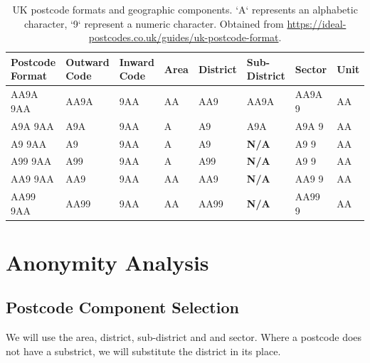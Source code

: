 \documentclass[12pt, a4paper]{article}
\begin{document}
\begin{table}
\begin{center}
	\begin{tabular}{ m{}  m{}  m{}  m{}  m{}  m{}  m{}  m{}}
		Postcode Format & Outward Code & Inward Code & Area & District & Sub-District & Sector & Unit \\ \toprule
		AA9A 9AA & AA9A & 9AA & AA & AA9 & AA9A & AA9A 9 & AA \\
        A9A 9AA & A9A & 9AA & A & A9 & A9A & A9A 9 & AA \\
        A9 9AA & A9 & 9AA & A & A9 & \textbf{\textbf{N/A}} & A9 9 & AA \\
        A99 9AA & A99 & 9AA & A & A99 & \textbf{N/A} & A9 9 & AA \\
        AA9 9AA & AA9 & 9AA & AA & AA9 & \textbf{N/A} & AA9 9 & AA \\
        AA99 9AA & AA99 & 9AA  & AA & AA99 & \textbf{N/A} & AA99 9 & AA\\
	\end{tabular}
\end{center}
\caption{UK postcode formats and geographic components. `A` represents an alphabetic character, `9` represent a numeric character. Obtained from \url{https://ideal-postcodes.co.uk/guides/uk-postcode-format}.}\label{table:postcode_format}
\end{table}

\section{Anonymity Analysis}
\subsection{Postcode Component Selection}



We will use the area, district, sub-district and and sector. Where a postcode does not have a substrict, we will substitute the district in its place.
\end{document}
